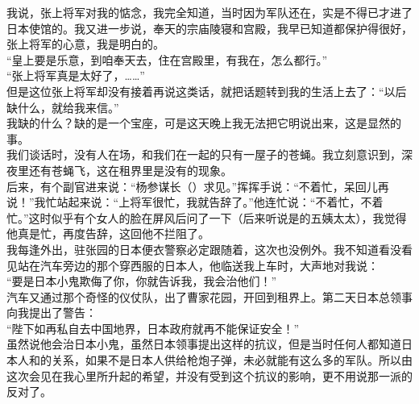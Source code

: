 我说，张上将军对我的惦念，我完全知道，当时因为军队还在，实是不得已才进了日本使馆的。我又进一步说，奉天的宗庙陵寝和宫殿，我早已知道都保护得很好，张上将军的心意，我是明白的。\\

“皇上要是乐意，到咱奉天去，住在宫殿里，有我在，怎么都行。”\\

“张上将军真是太好了，……”\\

但是这位张上将军却没有接着再说这类话，就把话题转到我的生活上去了：“以后缺什么，就给我来信。”\\

我缺的什么？缺的是一个宝座，可是这天晚上我无法把它明说出来，这是显然的事。\\

我们谈话时，没有人在场，和我们在一起的只有一屋子的苍蝇。我立刻意识到，深夜里还有苍蝇飞，这在租界里是没有的现象。\\

后来，有个副官进来说：“杨参谋长（）求见。”挥挥手说：“不着忙，呆回儿再说！”我忙站起来说：“上将军很忙，我就告辞了。”他连忙说：“不着忙，不着忙。”这时似乎有个女人的脸在屏风后问了一下（后来听说是的五姨太太），我觉得他真是忙，再度告辞，这回他不拦阻了。\\

我每逢外出，驻张园的日本便衣警察必定跟随着，这次也没例外。我不知道看没看见站在汽车旁边的那个穿西服的日本人，他临送我上车时，大声地对我说：\\

“要是日本小鬼欺侮了你，你就告诉我，我会治他们！”\\

汽车又通过那个奇怪的仪仗队，出了曹家花园，开回到租界上。第二天日本总领事向我提出了警告：\\

“陛下如再私自去中国地界，日本政府就再不能保证安全！”\\

虽然说他会治日本小鬼，虽然日本领事提出这样的抗议，但是当时任何人都知道日本人和的关系，如果不是日本人供给枪炮子弹，未必就能有这么多的军队。所以由这次会见在我心里所升起的希望，并没有受到这个抗议的影响，更不用说那一派的反对了。\\

